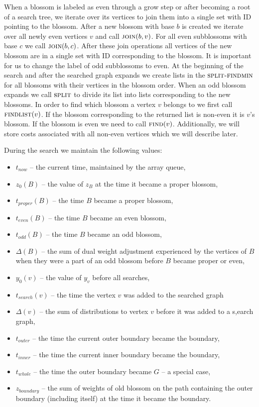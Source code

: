 When a blossom is labeled as even through a grow step or after becoming a root of a search tree, we iterate over its vertices to join them into a single set with ID pointing to the blossom. After a new blossom with base $b$ is created we iterate over all newly even vertices $v$ and call $\textsc{join}(b, v)$. For all even subblossoms with base $c$ we call $\textsc{join}(b, c)$. After these join operations all vertices of the new blossom are in a single set with ID corresponding to the blossom. It is important for us to change the label of odd subblossoms to even. At the beginning of the search and after the searched graph expands we create lists in the $\textsc{split-findmin}$ for all blossoms with their vertices in the blossom order. When an odd blossom expands we call $\textsc{split}$ to divide its list into lists corresponding to the new blossoms. In order to find which blossom a vertex $v$ belongs to we first call $\textsc{findlist}(v)$. If the blossom corresponding to the returned list is non-even it is $v$'s blossom. If the blossom is even we need to call $\textsc{find}(v)$. Additionally, we will store costs associated with all non-even vertices which we will describe later.

During the search we maintain the following values:

\begin{itemize}
    \item $t_{now}$ – the current time, maintained by the array queue,
    \item $z_0(B)$ – the value of $z_B$ at the time it became a proper blossom,
    \item $t_{proper}(B)$ – the time $B$ became a proper blossom,
    \item $t_{even}(B)$ – the time $B$ became an even blossom,
    \item $t_{odd}(B)$ – the time $B$ became an odd blossom,
    \item $\Delta(B)$ – the sum of dual weight adjustment experienced by the vertices of $B$ when they were a part of an odd blossom before $B$ became proper or even,
    \item $y_0(v)$ – the value of $y_v$ before all searches,
    \item $t_{search}(v)$ – the time the vertex $v$ was added to the searched graph
    \item $\Delta(v)$ – the sum of distributions to vertex $v$ before it was added to a s,earch graph,
    \item $t_{outer}$ – the time the current outer boundary became the boundary,
    \item $t_{inner}$ – the time the current inner boundary became the boundary,
    \item $t_{whole}$ – the time the outer boundary became $G$ – a special case,
    \item $z_{boundary}$ – the sum of weights of old blossom on the path containing the outer boundary (including itself) at the time it became the boundary.
\end{itemize}

